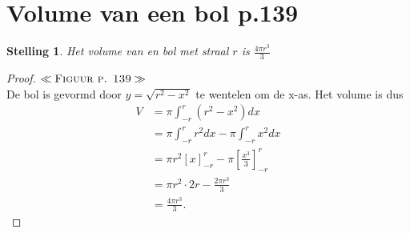 \documentclass{article}
\newtheorem*{Stelling}{Stelling}
\begin{document}
\section{Volume van een bol p.139}
\begin{Stelling}
    Het volume van en bol met straal $r$ is $\frac{4\pi r^3}{3}$
\end{Stelling}
\begin{proof}
    $\ll\textsc{Figuur p. 139}\gg$\\ De bol is gevormd door $y=\sqrt{r^2-x^2}$ te wentelen om de x-as. Het volume is dus 
    \begin{align*}
        V &= \pi\int_{-r}^r (r^2-x^2) dx\\&= \pi\int_{-r}^r r^2 dx -\pi\int_{-r}^r x^2 dx\\&=\pi r^2\left[x\right]_{-r}^r - \pi\left[\frac{x^3}{3}\right]_{-r}^r\\&=\pi r^2\cdot 2r - \frac{2\pi r^3}{3}\\&=\frac{4\pi r^3}{3}.
    \end{align*}
\end{proof}\newpage
\end{document}
